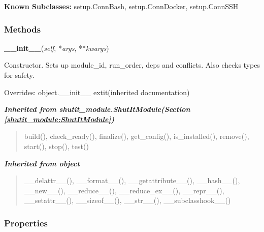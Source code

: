 \textbf{Known Subclasses:}
setup.ConnBash,
    setup.ConnDocker,
    setup.ConnSSH



  \subsubsection{Methods}

    \vspace{0.5ex}

\hspace{.8\funcindent}\begin{boxedminipage}{\funcwidth}

    \raggedright \textbf{\_\_init\_\_}(\textit{self}, *\textit{args}, **\textit{kwargs})

\setlength{\parskip}{2ex}
    Constructor. Sets up module\_id, run\_order, deps and conflicts. Also 
    checks types for safety.

\setlength{\parskip}{1ex}
      Overrides: object.\_\_init\_\_ 	extit{(inherited documentation)}

    \end{boxedminipage}


\large{\textbf{\textit{Inherited from shutit\_module.ShutItModule\textit{(Section \ref{shutit_module:ShutItModule})}}}}

\begin{quote}
build(), check\_ready(), finalize(), get\_config(), is\_installed(), remove(), start(), stop(), test()
\end{quote}

\large{\textbf{\textit{Inherited from object}}}

\begin{quote}
\_\_delattr\_\_(), \_\_format\_\_(), \_\_getattribute\_\_(), \_\_hash\_\_(), \_\_new\_\_(), \_\_reduce\_\_(), \_\_reduce\_ex\_\_(), \_\_repr\_\_(), \_\_setattr\_\_(), \_\_sizeof\_\_(), \_\_str\_\_(), \_\_subclasshook\_\_()
\end{quote}


  \subsubsection{Properties}

